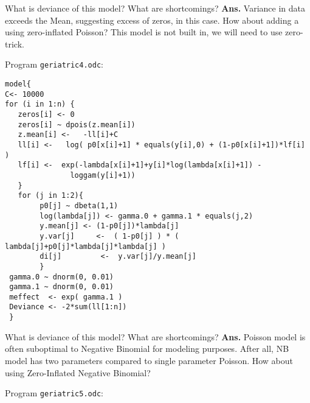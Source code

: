 \documentclass[12pt]{article}
\begin{document}
What is deviance of this model? What are shortcomings?
{\bf Ans.}   Variance in data exceeds the Mean, suggesting excess of
zeros, in this case. 
How about adding a using zero-inflated Poisson? This model is
not built in, we will need to use zero-trick.


\vspace*{0.1in}

 Program {\tt geriatric4.odc}:

\begin{verbatim}
model{
C<- 10000
for (i in 1:n) {
   zeros[i] <- 0
   zeros[i] ~ dpois(z.mean[i])
   z.mean[i] <-   -ll[i]+C
   ll[i] <-   log( p0[x[i]+1] * equals(y[i],0) + (1-p0[x[i]+1])*lf[i] )
   lf[i] <-  exp(-lambda[x[i]+1]+y[i]*log(lambda[x[i]+1]) -
               loggam(y[i]+1))
   }
   for (j in 1:2){
        p0[j] ~ dbeta(1,1)
        log(lambda[j]) <- gamma.0 + gamma.1 * equals(j,2)
        y.mean[j] <- (1-p0[j])*lambda[j]
        y.var[j]     <-  ( 1-p0[j] ) * ( lambda[j]+p0[j]*lambda[j]*lambda[j] )
        di[j]         <-  y.var[j]/y.mean[j]
        }
 gamma.0 ~ dnorm(0, 0.01)
 gamma.1 ~ dnorm(0, 0.01)
 meffect  <- exp( gamma.1 )
 Deviance <- -2*sum(ll[1:n])
 }
\end{verbatim}

What is deviance of this model? What are shortcomings?
{\bf Ans.}  Poisson model is often suboptimal to Negative Binomial for modeling
purposes. After all, NB model has two parameters compared to single parameter Poisson. 
How about using Zero-Inflated Negative Binomial?

 

\vspace*{0.1in}

 Program {\tt geriatric5.odc}:
\end{document}
